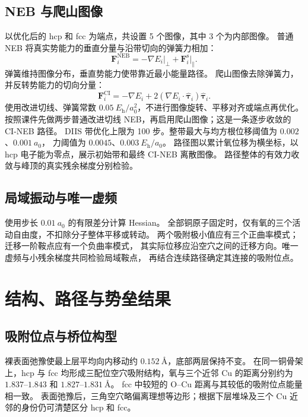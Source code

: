 \documentclass[UTF8,a4paper,12pt,fontset=fandol]{ctexart}
\begin{document}
\subsection{NEB 与爬山图像}
以优化后的 hcp 和 fcc 为端点，共设置 5 个图像，其中 3 个为内部图像。
普通 NEB 将真实势能力的垂直分量与沿带切向的弹簧力相加：
\begin{equation}
\mathbf F_i^{\mathrm{NEB}}=-\nabla E_i\big|_\perp+\mathbf F_i^{\mathrm s}\big|_\parallel.
\end{equation}
弹簧维持图像分布，垂直势能力使带靠近最小能量路径。
爬山图像去除弹簧力，并反转势能力的切向分量\cite{cineb}：
\begin{equation}
\mathbf F_i^{\mathrm{CI}}=-\nabla E_i+2(\nabla E_i\cdot\hat{\boldsymbol\tau}_i)\hat{\boldsymbol\tau}_i.
\end{equation}
使用改进切线\cite{tangent}、弹簧常数 $0.05\ E_{\mathrm h}/a_0^2$，不进行图像旋转、平移对齐或端点再优化。
按照课件先做两步普通改进切线 NEB，再启用爬山图像；这是一条逐步收敛的 CI-NEB 路径。
DIIS 带优化上限为 100 步。整带最大与均方根位移阈值为 $0.002$、$0.001\ a_0$，
力阈值为 $0.0045$、$0.003\ E_{\mathrm h}/a_0$\cite{cp2kband}。
路径图以累计氧位移为横坐标，以 hcp 电子能为零点，展示初始带和最终 CI-NEB 离散图像。
路径整体的有效力收敛与峰顶的真实残余梯度分别检验。

\subsection{局域振动与唯一虚频}
使用步长 $0.01\ a_0$ 的有限差分计算 Hessian\cite{cp2kfreq}。
全部铜原子固定时，仅有氧的三个活动自由度，不扣除分子整体平移或转动。
两个吸附极小值应有三个正曲率模式；迁移一阶鞍点应有一个负曲率模式，
其实际位移应沿空穴之间的迁移方向。唯一虚频与小残余梯度共同检验局域鞍点，
再结合连续路径确定其连接的吸附位点。

\section{结构、路径与势垒结果}
\subsection{吸附位点与桥位构型}
裸表面弛豫使最上层平均向内移动约 $0.152\ \text{\AA}$，底部两层保持不变。
在同一铜骨架上，hcp 与 fcc 均形成三配位空穴吸附结构，氧与三个近邻 Cu 的距离分别约为
$1.837$--$1.843$ 和 $1.827$--$1.831\ \text{\AA}$。
fcc 中较短的 O--Cu 距离与其较低的吸附位点能量相一致。
表面弛豫后，三角空穴略偏离理想等边形；根据下层堆垛及三个 Cu 近邻的身份仍可清楚区分 hcp 和 fcc。
\end{document}
